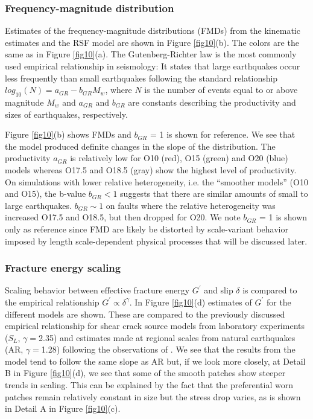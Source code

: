 \documentclass[preprint,1p, 10pt,authoryear]{elsarticle}
\begin{document}
\subsubsection{Frequency-magnitude distribution}
Estimates of the frequency-magnitude distributions (FMDs) from the kinematic estimates and the RSF model are shown in Figure \ref{fig10}(b). The colors are the same as in Figure \ref{fig10}(a).  The Gutenberg-Richter \citep{Gutenberg1944} law is the most commonly used empirical relationship in seismology:  It states that large earthquakes occur less frequently than small earthquakes following the standard relationship $log_{10}(N)= a_{GR} - b_{GR}M_{w}$, where $N$ is the number of events equal to or above magnitude $M_{w}$ and $a_{GR}$ and $b_{GR}$ are constants describing the productivity and sizes of earthquakes, respectively\cite[e.g.][]{Wiemer2002}.  

Figure \ref{fig10}(b) shows FMDs and $b_{GR}$ = 1 is shown for reference. We see that the model produced definite changes in the slope of the distribution.  The productivity $a_{GR}$  is relatively low for O10 (red), O15 (green) and O20 (blue) models whereas O17.5 and O18.5 (gray) show the highest level of productivity. On simulations with lower relative heterogeneity, i.e. the ``smoother models'' (O10 and O15), the b-value $b_{GR} < 1$ suggests that there are similar amounts of small to large earthquakes.  $b_{GR} \sim 1$ on faults where the relative heterogeneity was increased O17.5 and O18.5, but then dropped for O20. We note $b_{GR}$ = 1 is shown only as reference since FMD are likely be distorted by scale-variant behavior imposed by length scale-dependent physical processes that will be discussed later.

\subsubsection{Fracture energy scaling}
\label{FracEnergy}
Scaling behavior between effective fracture energy $G^{'}$ and slip $\delta$  is compared to the  empirical relationship $G^{'} \propto \delta^{\gamma}$. In Figure \ref{fig10}(d) estimates of $G^{'}$ for the different models are shown. These are compared to the previously discussed empirical relationship for shear crack source models from laboratory experiments ($S_{L}$, $\gamma = $2.35) \citep{Selvadurai2019}  and estimates made at regional scales from natural earthquakes (AR, $\gamma = $1.28) following the observations of \citet{Abercrombie2005}.  We see that the results from the model tend to follow the same slope as AR but, if we look more closely, at Detail B in Figure \ref{fig10}(d), we see that some of the smooth patches show steeper trends in scaling. This can be explained by the fact that the preferential worn patches remain relatively constant in size but the stress drop varies, as is shown in Detail A in Figure \ref{fig10}(c).
\end{document}
